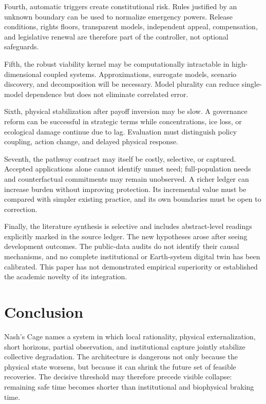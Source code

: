 \documentclass[11pt,a4paper]{article}
\numberwithin{equation}{section}
\theoremstyle{definition}
\theoremstyle{plain}
\theoremstyle{remark}
\begin{document}
Fourth, automatic triggers create constitutional risk. Rules justified by an unknown boundary can be used to normalize emergency powers. Release conditions, rights floors, transparent models, independent appeal, compensation, and legislative renewal are therefore part of the controller, not optional safeguards.

Fifth, the robust viability kernel may be computationally intractable in high-dimensional coupled systems. Approximations, surrogate models, scenario discovery, and decomposition will be necessary. Model plurality can reduce single-model dependence but does not eliminate correlated error.

Sixth, physical stabilization after payoff inversion may be slow. A governance reform can be successful in strategic terms while concentrations, ice loss, or ecological damage continue due to lag. Evaluation must distinguish policy coupling, action change, and delayed physical response.

Seventh, the pathway contract may itself be costly, selective, or captured. Accepted applications alone cannot identify unmet need; full-population needs and counterfactual commitments may remain unobserved. A richer ledger can increase burden without improving protection. Its incremental value must be compared with simpler existing practice, and its own boundaries must be open to correction.

Finally, the literature synthesis is selective and includes abstract-level readings explicitly marked in the source ledger. The new hypotheses arose after seeing development outcomes. The public-data audits do not identify their causal mechanisms, and no complete institutional or Earth-system digital twin has been calibrated. This paper has not demonstrated empirical superiority or established the academic novelty of its integration.

\section{Conclusion}

Nash's Cage names a system in which local rationality, physical externalization, short horizons, partial observation, and institutional capture jointly stabilize collective degradation. The architecture is dangerous not only because the physical state worsens, but because it can shrink the future set of feasible recoveries. The decisive threshold may therefore precede visible collapse: remaining safe time becomes shorter than institutional and biophysical braking time.
\end{document}
